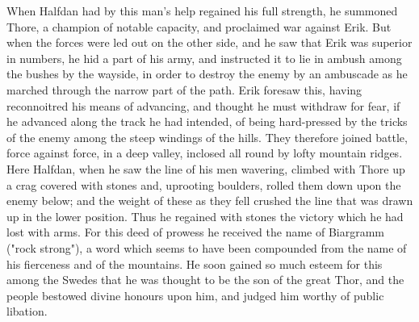 \documentclass[10pt,a4paper]{report}
\begin{document}
When Halfdan had by this man's help regained his full strength, he summoned Thore, a champion of notable capacity, and proclaimed war against Erik. But when the forces were led out on the other side, and he saw that Erik was superior in numbers, he hid a part of his army, and instructed it to lie in ambush among the bushes by the wayside, in order to destroy the enemy by an ambuscade as he marched through the narrow part of the path. Erik foresaw this, having reconnoitred his means of advancing, and thought he must withdraw for fear, if he advanced along the track he had intended, of being hard-pressed by the tricks of the enemy among the steep windings of the hills. They therefore joined battle, force against force, in a deep valley, inclosed all round by lofty mountain ridges. Here Halfdan, when he saw the line of his men wavering, climbed with Thore up a crag covered with stones and, uprooting boulders, rolled them down upon the enemy below; and the weight of these as they fell crushed the line that was drawn up in the lower position. Thus he regained with stones the victory which he had lost with arms. For this deed of prowess he received the name of Biargramm ("rock strong"), a word which seems to have been compounded from the name of his fierceness and of the mountains. He soon gained so much esteem for this among the Swedes that he was thought to be the son of the great Thor, and the people bestowed divine honours upon him, and judged him worthy of public libation.\\
\end{document}
